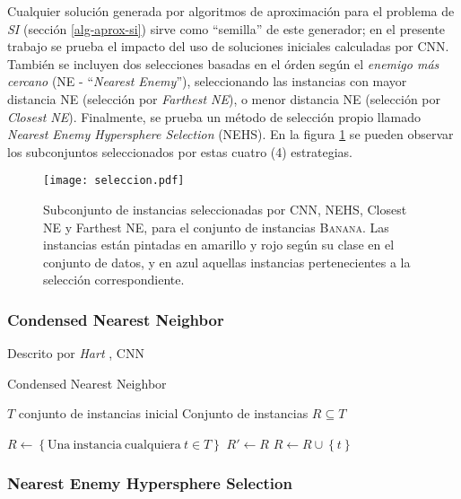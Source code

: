 Cualquier solución generada por algoritmos de aproximación para el problema de \emph{SI} (sección \ref{alg-aprox-si}) sirve como ``semilla'' de este generador; en el presente trabajo se prueba el impacto del uso de soluciones iniciales calculadas por CNN. También se incluyen dos selecciones basadas en el órden según el \emph{enemigo más cercano} (NE - ``\emph{Nearest Enemy}''), seleccionando las instancias con mayor distancia NE (selección por \emph{Farthest NE}), o menor distancia NE (selección por \emph{Closest NE}). Finalmente, se prueba un método de selección propio llamado \emph{Nearest Enemy Hypersphere Selection} (NEHS). En la figura \ref{seleccion} se pueden observar los subconjuntos seleccionados por estas cuatro (4) estrategias.

\begin{figure}[h!]
\centering
\texttt{[image: seleccion.pdf]}
\caption[Algoritmos de Selección de Instancias]{Subconjunto de instancias seleccionadas por CNN, NEHS, Closest NE y Farthest NE, para el conjunto de instancias \textsc{Banana}. Las instancias están pintadas en amarillo y rojo según su clase en el conjunto de datos, y en azul aquellas instancias pertenecientes a la selección correspondiente.}
\label{seleccion}
\end{figure}

\subsubsection{Condensed Nearest Neighbor}

Descrito por \emph{Hart} \cite{Hart:2006:CNN:2263267.2267647}, CNN 

\begin{algorithm}
\caption{Condensed Nearest Neighbor}
\label{cnn-alg}
\begin{algorithmic}[1]

\Require $T$ conjunto de instancias inicial
\Ensure Conjunto de instancias $R \subseteq T$

\State $R \gets \left\lbrace \mathrm{Una\ instancia\ cualquiera}\ t \in T \right\rbrace$
\Repeat
	\State $R' \gets R$
			\State $R \gets R \cup \left\lbrace t \right\rbrace$
		\EndIf
	\EndFor
{}
\State {}
\end{algorithmic}
\end{algorithm}

\subsubsection{Nearest Enemy Hypersphere Selection}

